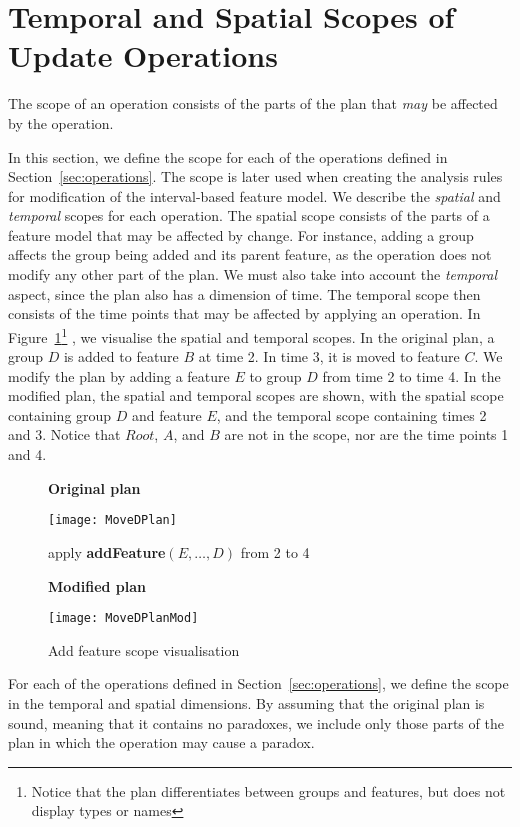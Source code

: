 
\section{Temporal and Spatial Scopes of Update Operations}
\label{sec:scope}

The scope of an operation consists of the parts of the plan that \emph{may} be affected by the operation. 

In this section, we define the scope for each of the operations defined in Section~\vref{sec:operations}. The scope is later used when creating the analysis rules for modification of the interval-based feature model. We describe the \emph{spatial} and \emph{temporal} scopes for each operation. The spatial scope consists of the parts of a feature model that may be affected by change. For instance, adding a group affects the group being added and its parent feature, as the operation does not modify any other part of the plan. We must also take into account the \emph{temporal} aspect, since the plan also has a dimension of time. The temporal scope then consists of the time points that may be affected by applying an operation. In Figure~\ref{ex:add-feature-scope}\footnote{Notice that the plan differentiates between groups and features, but does not display types or names} 
, we visualise the spatial and temporal scopes. In the original plan, a group $D$ is added to feature $B$ at time 2. In time 3, it is moved to feature $C$. We modify the plan by adding a feature $E$ to group $D$ from time 2 to time 4. In the modified plan, the spatial and temporal scopes are shown, with the spatial scope containing group $D$ and feature $E$, and the temporal scope containing times 2 and 3. Notice that $Root$, $A$, and $B$ are not in the scope, nor are the time points 1 and 4.
\begin{figure}[h]
  \centering
      \textbf{Original plan}

      \texttt{[image: MoveDPlan]}
      \bigskip
      
      apply \textbf{addFeature}$(E, \ldots, D)$ from 2 to 4  
      \bigskip

      \textbf{Modified plan}

      \texttt{[image: MoveDPlanMod]}
  \caption{Add feature scope visualisation}
  \label{ex:add-feature-scope}
\end{figure}

For each of the operations defined in Section~\vref{sec:operations}, we define the scope in the temporal and spatial dimensions. By assuming that the original plan is sound, meaning that it contains no paradoxes, we include only those parts of the plan in which the operation may cause a paradox.

